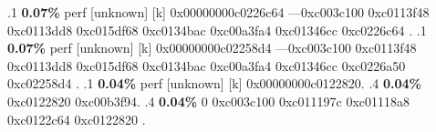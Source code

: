 \begin{profile}
{.1 \textbf{ 0.07\%} perf             [unknown]              [k] 0x00000000c0226c64\newline {} ---0xc003c100\newline {} 0xc0113f48\newline {} 0xc0113dd8\newline {} 0xc015df68\newline {} 0xc0134bac\newline {} 0xc00a3fa4\newline {} 0xc01346cc\newline {} 0xc0226c64\newline {} . 
.1 \textbf{ 0.07\%} perf             [unknown]              [k] 0x00000000c02258d4\newline {} ---0xc003c100\newline {} 0xc0113f48\newline {} 0xc0113dd8\newline {} 0xc015df68\newline {} 0xc0134bac\newline {} 0xc00a3fa4\newline {} 0xc01346cc\newline {} 0xc0226a50\newline {} 0xc02258d4\newline {} . 
.1 \textbf{ 0.04\%} perf             [unknown]              [k] 0x00000000c0122820. 
.4 \textbf{0.04\%} 0xc0122820\newline {} 0xc00b3f94. 
.4 \textbf{0.04\%} 0\newline {} 0xc003c100\newline {} 0xc011197c\newline {} 0xc01118a8\newline {} 0xc0122c64\newline {} 0xc0122820\newline {} . 
}
\end{profile}

